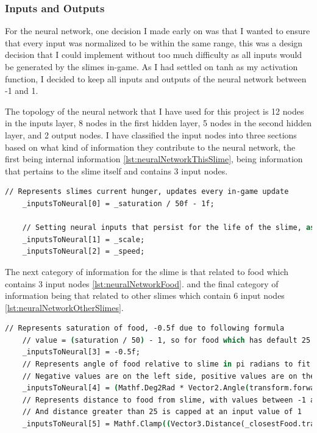 \subsubsection{Inputs and Outputs}
For the neural network, one decision I made early on was that I wanted to ensure that every input was normalized to be within the same range, this was a design decision that I could implement without too much difficulty as all inputs would be generated by the slimes in-game. As I had settled on tanh as my activation function, I decided to keep all inputs and outputs of the neural network between -1 and 1.
\par
The topology of the neural network that I have used for this project is 12 nodes in the inputs layer, 8 nodes in the first hidden layer, 5 nodes in the second hidden layer, and 2 output nodes. I have classified the input nodes into three sections based on what kind of information they contribute to the neural network, the first being internal information \ref{lst:neuralNetworkThisSlime}, being information that pertains to the slime itself and contains 3 input nodes.
\begin{lstlisting}[language=csh, caption=Neural Networks inputs for The Slime, label={lst:neuralNetworkThisSlime}]
    // Represents slimes current hunger, updates every in-game update
    _inputsToNeural[0] = _saturation / 50f - 1f;

    // Setting neural inputs that persist for the life of the slime, as neither _scale nor _speed can change, these inputs are set once and never changed
    _inputsToNeural[1] = _scale;
    _inputsToNeural[2] = _speed;
\end{lstlisting}
\par
The next category of information for the slime is that related to food which contains 3 input nodes \ref{lst:neuralNetworkFood}. and the final category of information being that related to other slimes which contain 6 input nodes \ref{lst:neuralNetworkOtherSlimes}.
\begin{lstlisting}[language=csh, caption=Neural Networks inputs for Food, label={lst:neuralNetworkFood}]
     // Represents saturation of food, -0.5f due to following formula
    // value = (saturation / 50) - 1, so for food which has default 25 = -0.5f
    _inputsToNeural[3] = -0.5f;
    // Represents angle of food relative to slime in pi radians to fit in with scheme of inputs being -1 to 1,
    // Negative values are on the left side, positive values are on the right
    _inputsToNeural[4] = (Mathf.Deg2Rad * Vector2.Angle(transform.forward, (Vector2)(_closestFood.transform.position - transform.position))) - 1;
    // Represents distance to food from slime, with values between -1 and 1,
    // And distance greater than 25 is capped at an input value of 1
    _inputsToNeural[5] = Mathf.Clamp((Vector3.Distance(_closestFood.transform.position, transform.position) / 12.5f) - 1f, -1f, 1f);
\end{lstlisting}
